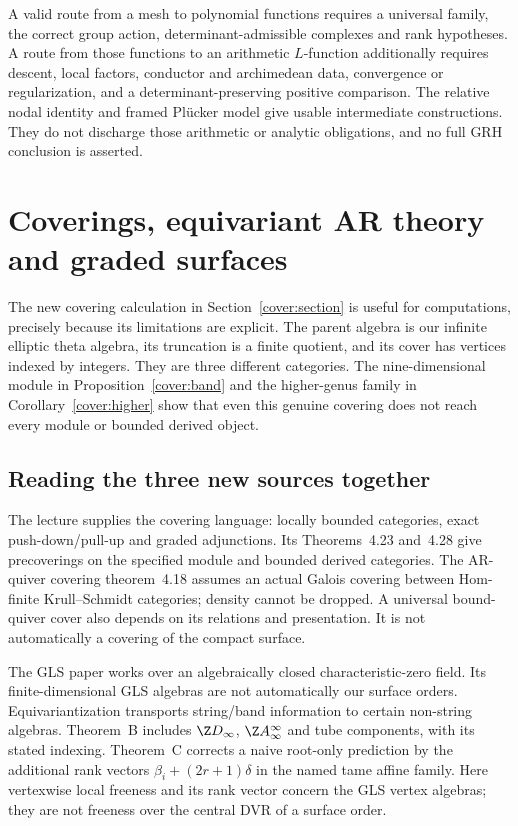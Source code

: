 \documentclass[11pt,oneside,openany]{book}
\theoremstyle{definition}\newtheorem{definition}[theorem]{Definition}
\theoremstyle{remark}\newtheorem{remark}[theorem]{Remark}
\begin{document}
A valid route from a mesh to polynomial functions requires a universal
family, the correct group action, determinant-admissible complexes and
rank hypotheses. A route from those functions to an arithmetic $L$-function
additionally requires descent, local factors, conductor and archimedean data,
convergence or regularization, and a determinant-preserving positive comparison.
The relative nodal identity and framed Pl\"ucker model give usable intermediate
constructions. They do not discharge those arithmetic or analytic obligations,
and no full GRH conclusion is asserted.

\chapter{Coverings, equivariant AR theory and graded surfaces}
\label{cover:chapter}
The new covering calculation in Section~\ref{cover:section} is useful for
computations, precisely because its limitations are explicit. The parent
algebra is our infinite elliptic theta algebra, its truncation is a finite
quotient, and its cover has vertices indexed by integers. They are three
different categories. The nine-dimensional module in
Proposition~\ref{cover:band} and the higher-genus family in
Corollary~\ref{cover:higher} show that even this genuine covering does not
reach every module or bounded derived object.

\section{Reading the three new sources together}
The lecture \cite{CoveringLecture2026} supplies the covering language:
locally bounded categories, exact push-down/pull-up and graded adjunctions.
Its Theorems~4.23 and~4.28 give precoverings on the specified module and bounded
derived categories. The AR-quiver covering theorem~4.18 assumes an actual
Galois covering between Hom-finite Krull--Schmidt categories; density cannot
be dropped. A universal bound-quiver cover also depends on its relations and
presentation. It is not automatically a covering of the compact surface.

The GLS paper \cite{TameGLS2026} works over an algebraically closed
characteristic-zero field. Its finite-dimensional GLS algebras are not
automatically our surface orders. Equivariantization transports string/band
information to certain non-string algebras. Theorem~B includes
$\Z D_\infty$, $\Z A_\infty^\infty$ and tube components, with its stated
indexing. Theorem~C corrects a naive root-only prediction by the additional
rank vectors $\beta_i+(2r+1)\delta$ in the named tame affine family.
Here vertexwise local freeness and its rank vector concern the GLS vertex
algebras; they are not freeness over the central DVR of a surface order.
\end{document}
